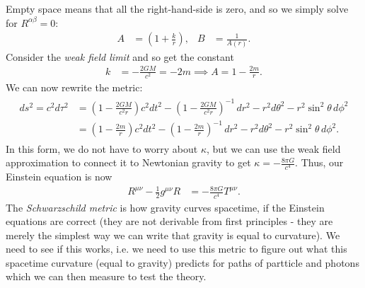 \documentclass[a4paper, 11pt, normalem]{report}
\begin{document}
Empty space means that all the right-hand-side is zero, and so we simply solve for $R^{\alpha\beta}=0$:
\begin{align}
    A &= \left(1 + \frac{k}{r}\right), & B &= \frac{1}{A(r)}.
\end{align}
Consider the \emph{weak field limit} and so get the constant
\begin{align}
    k &= -\frac{2GM}{c^2} = -2m \implies A = 1 - \frac{2m}{r}.
\end{align}
We can now rewrite the metric:
\begin{align}
    \begin{split}
        ds^2 = c^2d\tau^2 &= \left(1-\frac{2GM}{c^2r}\right)c^2dt^2 - \left(1-\frac{2GM}{c^2r}\right)^{-1}\,dr^2 - r^2d\theta^2 - r^2\sin^2\theta\,d\phi^2 \\
                          &= \left(1-\frac{2m}{r}\right)c^2dt^2 - \left(1-\frac{2m}{r}\right)^{-1}\,dr^2- r^2d\theta^2 - r^2\sin^2\theta\,d\phi^2.
    \end{split}
\end{align}
In this form, we do not have to worry about $\kappa$, but we can use the weak field approximation to connect it to Newtonian gravity to get $\kappa=-\frac{8\pi G}{c^4}$. 
Thus, our Einstein equation is now
\begin{align}
    R^{\mu\nu} - \frac12g^{\mu\nu}R &= -\frac{8\pi G}{c^4}T^{\mu\nu}.
\end{align}
The \emph{Schwarzschild metric} is how gravity curves spacetime, if the Einstein equations are correct (they are not derivable from first principles - they are merely the simplest way we can write that gravity is equal to curvature).
We need to see if this works, i.e. we need to use this metric to figure out what this spacetime curvature (equal to gravity) predicts for paths of partticle and photons which we can then measure to test the theory. 


\chapter{}

\chapter{}

\chapter{}
\end{document}
